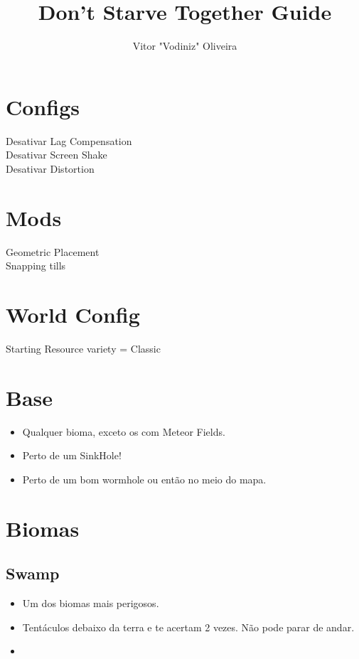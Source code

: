 \documentclass{article}
\begin{document}
\title{Don't Starve Together Guide}
\date{}
\author{Vitor "Vodiniz" Oliveira}
\maketitle{}
\pagebreak







\section{Configs}
Desativar Lag Compensation \\
Desativar Screen Shake \\
Desativar Distortion \\




\section{Mods}
Geometric Placement \\
Snapping tills \\




\section{World Config}
Starting Resource variety = Classic


\section{Base}
\begin{itemize}
    \item Qualquer bioma, exceto os com Meteor Fields.
    \item Perto de um SinkHole!
    \item Perto de um bom wormhole ou então no meio do mapa.
\end{itemize}


\section{Biomas}


\subsection*{Swamp}
\begin{itemize}
    \item Um dos biomas mais perigosos.
    \item Tentáculos debaixo da terra e te acertam 2 vezes. Não pode parar de andar.
    \item 
\end{itemize}
\end{document}
